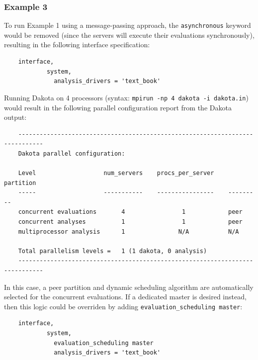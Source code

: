 \subsubsection{Example 3}\label{parallel:spec:multi:example3}

To run Example 1 using a message-passing approach, the
\texttt{asynchronous} keyword would be removed (since the servers will
execute their evaluations synchronously), resulting in the following
interface specification:
\begin{small}
\begin{verbatim}
    interface,
            system,
              analysis_drivers = 'text_book'
\end{verbatim}
\end{small}

Running Dakota on 4 processors (syntax: \texttt{mpirun -np 4 dakota -i
  dakota.in}) would result in the following parallel configuration
report from the Dakota output:
\begin{small}
\begin{verbatim}
    -----------------------------------------------------------------------------
    Dakota parallel configuration:

    Level                   num_servers    procs_per_server    partition
    -----                   -----------    ----------------    ---------
    concurrent evaluations       4                1            peer
    concurrent analyses          1                1            peer
    multiprocessor analysis      1               N/A           N/A

    Total parallelism levels =   1 (1 dakota, 0 analysis)
    -----------------------------------------------------------------------------
\end{verbatim}
\end{small}

In this case, a peer partition and dynamic scheduling algorithm are
automatically selected for the concurrent evaluations. If a dedicated
master is desired instead, then this logic could be overriden by adding
\texttt{evaluation\_scheduling master}:
\begin{small}
\begin{verbatim}
    interface,
            system,
              evaluation_scheduling master
              analysis_drivers = 'text_book'
\end{verbatim}
\end{small}


